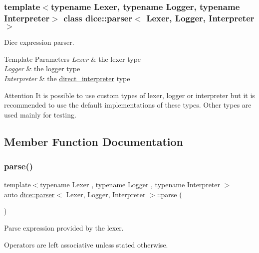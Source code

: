 \subsubsection*{template$<$typename Lexer, typename Logger, typename Interpreter$>$\newline
class dice\+::parser$<$ Lexer, Logger, Interpreter $>$}

Dice expression parser. 


\begin{DoxyTemplParams}{Template Parameters}
{\em Lexer} & the lexer type \\
\hline
{\em Logger} & the logger type \\
\hline
{\em Interpreter} & the \mbox{\hyperlink{classdice_1_1direct__interpreter}{direct\+\_\+interpreter}} type\\
\hline
\end{DoxyTemplParams}
\begin{DoxyAttention}{Attention}
It is possible to use custom types of lexer, logger or interpreter but it is recommended to use the default implementations of these types. Other types are used mainly for testing. 
\end{DoxyAttention}


\subsection{Member Function Documentation}
\mbox{\label{classdice_1_1parser_a9166865af1db0974b2b372885bcc1501}} 
\subsubsection{\texorpdfstring{parse()}{parse()}}
{\footnotesize\ttfamily template$<$typename Lexer , typename Logger , typename Interpreter $>$ \\
auto \mbox{\hyperlink{classdice_1_1parser}{dice\+::parser}}$<$ Lexer, Logger, Interpreter $>$\+::parse (\begin{DoxyParamCaption}{ }\end{DoxyParamCaption})\hspace{0.3cm}{\ttfamily [inline]}}



Parse expression provided by the lexer. 

Operators are left associative unless stated otherwise.

